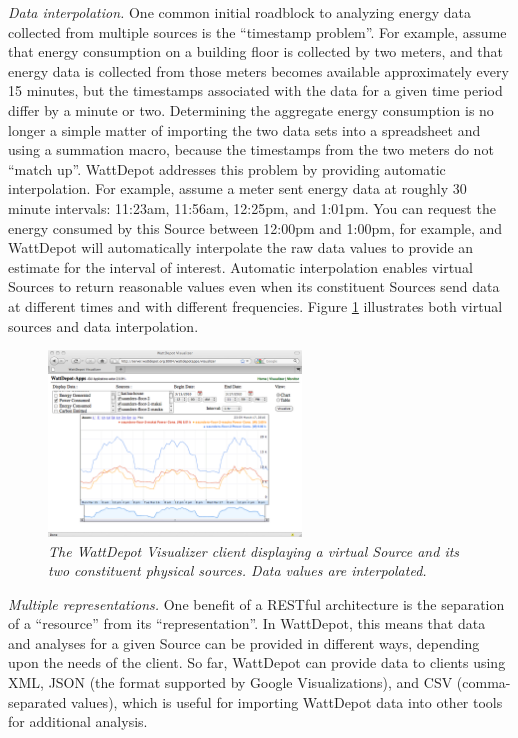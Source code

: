 \documentclass[conference,compsoc]{IEEEtran}
\begin{document}
{\em Data interpolation.} One common initial roadblock to analyzing energy
data collected from multiple sources is the ``timestamp problem''. For
example, assume that energy consumption on a building floor is collected by
two meters, and that energy data is collected from those meters becomes
available approximately every 15 minutes, but the timestamps associated
with the data for a given time period differ by a minute or two.
Determining the aggregate energy consumption is no longer a simple matter
of importing the two data sets into a spreadsheet and using a summation
macro, because the timestamps from the two meters do not ``match up''.
WattDepot addresses this problem by providing automatic interpolation. For
example, assume a meter sent energy data at roughly 30 minute intervals:
11:23am, 11:56am, 12:25pm, and 1:01pm.  You can request the energy consumed
by this Source between 12:00pm and 1:00pm, for example, and WattDepot will
automatically interpolate the raw data values to provide an estimate for
the interval of interest.  Automatic interpolation enables virtual Sources
to return reasonable values even when its constituent Sources send data at
different times and with different frequencies.  Figure \ref{fig:visualizer}
illustrates both virtual sources and data interpolation. 

\begin{figure}[!th]
  \center
  \includegraphics[width=0.6\textwidth]{visualizer.eps}
  \caption{\em \small The WattDepot Visualizer client displaying a virtual Source
    and its two constituent physical sources. Data values are interpolated.}
  \label{fig:visualizer}
\end{figure} 

{\em Multiple representations.} One benefit of a RESTful architecture is
the separation of a ``resource'' from its ``representation''.  In
WattDepot, this means that data and analyses for a given Source can be
provided in different ways, depending upon the needs of the client.  So
far, WattDepot can provide data to clients using XML, JSON (the format
supported by Google Visualizations), and CSV (comma-separated values),
which is useful for importing WattDepot data into other tools for
additional analysis.
\end{document}
